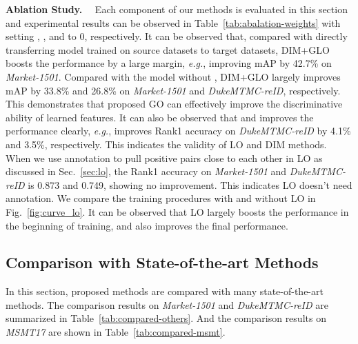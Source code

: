 \documentclass[sigconf]{acmart}
\begin{document}
\textbf{Ablation Study.} \ \
Each component of our methods is evaluated in this section and experimental results can be observed in Table~\ref{tab:abalation-weights} with setting , , and  to 0, respectively. It can be observed that, compared with directly transferring model trained on source datasets to target datasets, DIM+GLO boosts the performance by a large margin, \textit{e.g.}, improving mAP by 42.7\% on \textit{Market-1501}. Compared with the model without , DIM+GLO largely improves mAP by 33.8\% and 26.8\% on \textit{Market-1501} and \textit{DukeMTMC-reID}, respectively. This demonstrates that proposed GO can effectively improve the discriminative ability of learned features. It can also be observed that  and  improves the performance clearly, \textit{e.g.}, improves Rank1 accuracy on \textit{DukeMTMC-reID} by 4.1\% and 3.5\%, respectively. This indicates the validity of LO and DIM methods. When we use annotation to pull positive pairs close to each other in LO as discussed in Sec.~\ref{sec:lo}, the Rank1 accuracy on \textit{Market-1501} and \textit{DukeMTMC-reID} is 0.873 and 0.749, showing no improvement. This indicates LO doesn't need annotation. We compare the training procedures with and without LO in Fig.~\ref{fig:curve_lo}. It can be observed that LO largely boosts the performance in the beginning of training, and also improves the final performance.

\subsection{Comparison with State-of-the-art Methods}
\label{sec:experiment_comparison}
In this section, proposed methods are compared with many state-of-the-art methods. The comparison results on \textit{Market-1501} and \textit{DukeMTMC-reID} are summarized in Table~\ref{tab:compared-others}.
And the comparison results on \textit{MSMT17} are shown in Table~\ref{tab:compared-msmt}.
\end{document}
